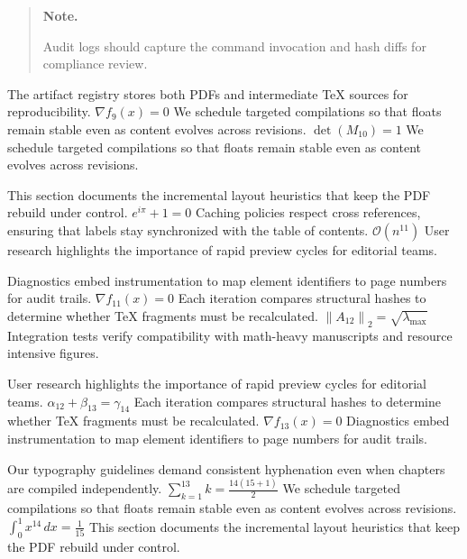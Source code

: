 \documentclass[12pt,a4paper,twocolumn]{article}
\newcommand{\paraid}[1]{\par\noindent\hypertarget{#1}{\ignorespaces}}
\begin{document}
\begin{quote}
\hypertarget{sec8-note}{\textbf{Note.}} 
      Audit logs should capture the command invocation and hash diffs for compliance review.
    
\end{quote}

\paraid{sec8-p1}The artifact registry stores both PDFs and intermediate TeX sources for reproducibility. $\nabla f_{9}(x) = 0$ We schedule targeted compilations so that floats remain stable even as content evolves across revisions. $\det(M_{10}) = 1$ We schedule targeted compilations so that floats remain stable even as content evolves across revisions.
\par

\paraid{sec8-p2}This section documents the incremental layout heuristics that keep the PDF rebuild under control. $e^{i\pi} + 1 = 0$ Caching policies respect cross references, ensuring that labels stay synchronized with the table of contents. $\mathcal{O}(n^{11})$ User research highlights the importance of rapid preview cycles for editorial teams.
\par

\paraid{sec8-p3}Diagnostics embed instrumentation to map element identifiers to page numbers for audit trails. $\nabla f_{11}(x) = 0$ Each iteration compares structural hashes to determine whether TeX fragments must be recalculated. $\left\|A_{12}\right\|_{2} = \sqrt{\lambda_{\max}}$ Integration tests verify compatibility with math-heavy manuscripts and resource intensive figures.
\par

\paraid{sec8-p4}User research highlights the importance of rapid preview cycles for editorial teams. $\alpha_{12} + \beta_{13} = \gamma_{14}$ Each iteration compares structural hashes to determine whether TeX fragments must be recalculated. $\nabla f_{13}(x) = 0$ Diagnostics embed instrumentation to map element identifiers to page numbers for audit trails.
\par

\paraid{sec8-p5}Our typography guidelines demand consistent hyphenation even when chapters are compiled independently. $\sum_{k=1}^{13} k = \frac{14(15+1)}{2}$ We schedule targeted compilations so that floats remain stable even as content evolves across revisions. $\int_{0}^{1} x^{14} \, dx = \frac{1}{15}$ This section documents the incremental layout heuristics that keep the PDF rebuild under control.
\par
\end{document}
